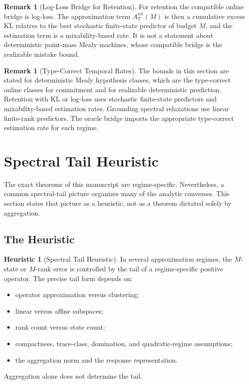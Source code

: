 \documentclass[12pt]{article}
\theoremstyle{definition}
\newtheorem{remark}[theorem]{Remark}
\newtheorem{heuristic}[theorem]{Heuristic}
\newcommand{\Aapp}{A_T}
\begin{document}
\begin{remark}[Log-Loss Bridge for Retention]
\label{rem:logloss-retention}
For retention the compatible online bridge is log-loss.  The approximation term
$\Aapp^{\mathrm{ret}}(M)$ is then a cumulative excess KL relative to the best
stochastic finite-state predictor of budget $M$, and the estimation term is a
mixability-based rate.  It is not a statement about deterministic point-mass
Mealy machines, whose compatible bridge is the realizable mistake bound.
\end{remark}

\begin{remark}[Type-Correct Temporal Rates]
\label{rem:temporal-type-correct}
The bounds in this section are stated for deterministic Mealy hypothesis
classes, which are the type-correct online classes for commitment and for
realizable deterministic prediction.  Retention with KL or log-loss uses
stochastic finite-state predictors and mixability-based estimation rates.
Grounding spectral relaxations use linear finite-rank predictors.  The oracle
bridge imports the appropriate type-correct estimation rate for each regime.
\end{remark}

\section{Spectral Tail Heuristic}
\label{sec:spectral-heuristic}

The exact theorems of this manuscript are regime-specific.  Nevertheless, a
common spectral-tail picture organizes many of the analytic converses.  This
section states that picture as a heuristic, not as a theorem dictated solely by
aggregation.

\subsection{The Heuristic}
\label{subsec:spectral-heuristic-statement}

\begin{heuristic}[Spectral Tail Heuristic]
\label{heur:spectral}
In several approximation regimes, the $M$-state or $M$-rank error is
controlled by the tail of a regime-specific positive operator.  The precise
tail form depends on:
\begin{itemize}
\item operator approximation versus clustering;
\item linear versus affine subspaces;
\item rank count versus state count;
\item compactness, trace-class, domination, and quadratic-regime
assumptions;
\item the aggregation norm and the response representation.
\end{itemize}
Aggregation alone does not determine the tail.
\end{heuristic}
\end{document}
